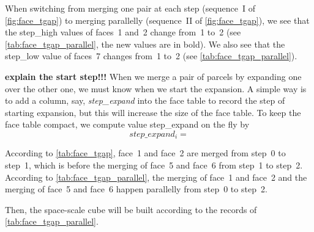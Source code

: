 \documentclass[ijgi,article,submit,moreauthors,pdftex]{Definitions/mdpi}
\begin{document}
When switching from merging one pair at each step 
(sequence~I of \fig\ref{fig:face_tgap})
to merging parallelly (sequence~II of \fig\ref{fig:face_tgap}),
we see that the step\_high values of faces~1 and~2 change from~1 to~2
(see \tbl\ref{tab:face_tgap_parallel}, the new values are in bold).
We also see that the step\_low value of faces~7 changes from~1 to~2
(see \tbl\ref{tab:face_tgap_parallel}).

\textbf{explain the start step!!!}
When we merge a pair of parcels by expanding one over the other one,
we must know when we start the expansion.
A simple way is to add a column, say, \emph{step\_expand} 
into the face table to record the step of starting expansion,
but this will increase the size of the face table.
To keep the face table compact,
we compute value step\_expand on the fly by
$$
step\_expand_i = 
$$


According to \tbl\ref{tab:face_tgap}, 
face~1 and face~2 are merged from step~0 to step~1,
which is before the merging of face~5 and face~6 from step~1 to step~2.
According to \tbl\ref{tab:face_tgap_parallel}, 
the merging of face~1 and face~2 and the merging of face~5 and face~6
happen parallelly from step~0 to step~2.

Then, the space-scale cube will be built 
according to the records of \tbl\ref{tab:face_tgap_parallel}.
\end{document}
